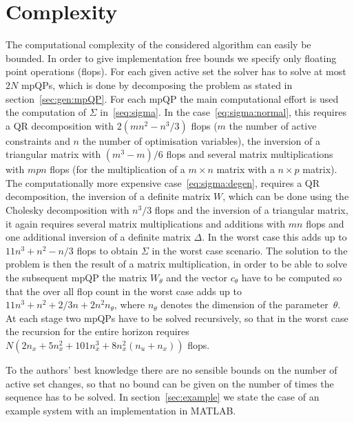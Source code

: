 \section{Complexity}\label{sec:complexity}
The computational complexity of the considered algorithm can easily be bounded. In order to give implementation
free bounds we specify only floating point operations (flops). For each given active set the solver has
to solve at most $2N$ mpQPs, which is done by decomposing the problem as stated in section~\ref{sec:gen:mpQP}.
For each mpQP the main computational effort is used the computation of $\Sigma$ in~\eqref{seq:sigma}.
In the case~\eqref{eq:sigma:normal}, this requires a QR decomposition with $2(mn^2-n^3/3)$ flops 
($m$ the number of active constraints and $n$ the number of optimisation variables), the inversion of a 
triangular matrix with $(m^3-m)/6$ flops and several matrix multiplications with $mpn$ flops (for the multiplication
of a $m\times n$ matrix with a $n\times p$ matrix).
The computationally more expensive case~\eqref{eq:sigma:degen}, requires a QR decomposition, the inversion of a
definite matrix $W$, which can be done using the Cholesky decomposition with $n^3/3$ flops and the inversion of a 
triangular matrix, it again requires several matrix multiplications and additions with $mn$ flops and one additional 
inversion of a definite matrix $\Delta$. In the worst case this adds up to $11n^3+n^2-n/3$ flops to obtain $\Sigma$
in the worst case scenario. The solution to the problem is then the result of a matrix multiplication, in order to 
be able to solve the subsequent mpQP the matrix $W_\theta$ and the vector $c_\theta$ have to be computed so that the over
all flop count in the worst case adds up to $11n^3+n^2+2/3n+2n^2 n_\theta$, where $n_\theta$ denotes the dimension of the
parameter~$\theta$. At each stage two mpQPs have to be solved recursively, so that in the worst case the recursion
for the entire horizon requires $N(2 n_x+5 n_x^2+101 n_x^3+8 n_x^2 (n_u+n_x))$ flops.

To the authors' best knowledge there are no sensible bounds on the number of
active set changes, so that no bound can be given on the number of times the sequence has to be solved.
In section~\ref{sec:example} we state the case of an example system with an implementation in MATLAB.


